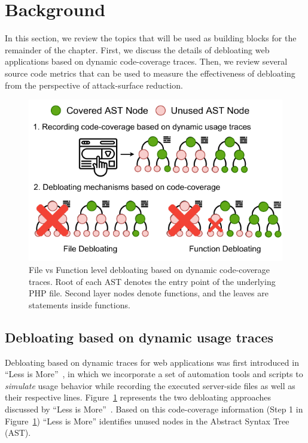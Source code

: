 \section{Background}

In this section, we review the topics that will be used as building blocks for the remainder of the chapter. 
First, we discuss the details of debloating web applications based on dynamic code-coverage traces. 
Then, we review several source code metrics that can be used to measure the effectiveness of debloating from the perspective of attack-surface reduction.

\begin{figure}[t]
    \centering
    \includegraphics[width=0.75\columnwidth]{figures/dbltr/file_vs_function_debloating.drawio.pdf}
    \caption{File vs Function level debloating based on dynamic code-coverage traces. Root of each AST denotes the entry point of the underlying PHP file. Second layer nodes denote functions, and the leaves are statements inside functions.}
    \label{fig:file_vs_func_debloating}
\end{figure}

\subsection{Debloating based on dynamic usage traces}
Debloating based on dynamic traces for web applications was first introduced in ``Less is More''~\cite{lessismore}, in which we incorporate a set of automation tools and scripts to \emph{simulate} usage behavior while recording the executed server-side files as well as their respective lines.
Figure~\ref{fig:file_vs_func_debloating} represents the two debloating approaches discussed by ``Less is More''~\cite{lessismore}. 
Based on this code-coverage information (Step 1 in Figure~\ref{fig:file_vs_func_debloating}) ``Less is More'' identifies unused nodes in the Abstract Syntax Tree (AST). 

